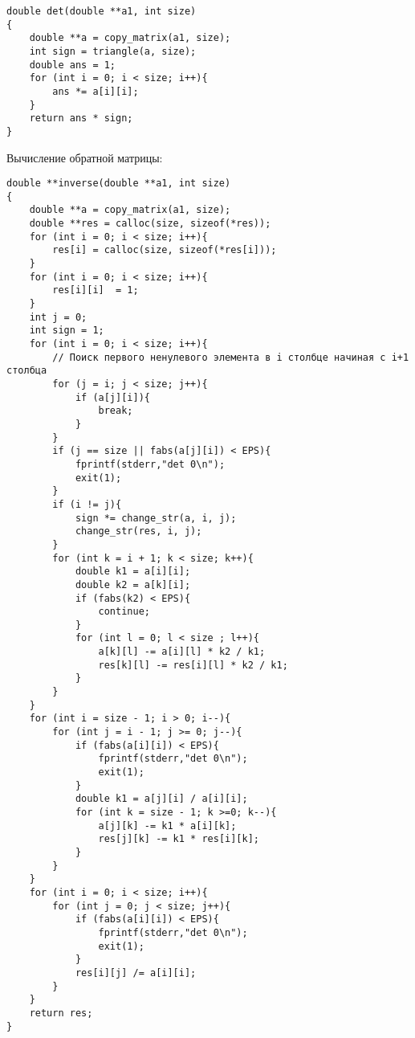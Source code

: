 \documentclass[a4paper,12pt,titlepage,finall]{article}
\begin{document}
\begin{itemize}
\begin{lstlisting}
double det(double **a1, int size)
{
    double **a = copy_matrix(a1, size);
    int sign = triangle(a, size);
    double ans = 1;
    for (int i = 0; i < size; i++){
        ans *= a[i][i];
    }
    return ans * sign;
}
\end{lstlisting}
\newpage
Вычисление обратной матрицы:
\begin{lstlisting}
double **inverse(double **a1, int size)
{
    double **a = copy_matrix(a1, size);
    double **res = calloc(size, sizeof(*res));
    for (int i = 0; i < size; i++){
        res[i] = calloc(size, sizeof(*res[i]));
    }
    for (int i = 0; i < size; i++){
        res[i][i]  = 1;
    }
    int j = 0;
    int sign = 1;
    for (int i = 0; i < size; i++){
        // Поиск первого ненулевого элемента в i столбце начиная с i+1 столбца
        for (j = i; j < size; j++){
            if (a[j][i]){
                break;
            }
        }
        if (j == size || fabs(a[j][i]) < EPS){
            fprintf(stderr,"det 0\n");
            exit(1);
        }
        if (i != j){
            sign *= change_str(a, i, j);
            change_str(res, i, j);
        }
        for (int k = i + 1; k < size; k++){
            double k1 = a[i][i];
            double k2 = a[k][i];
            if (fabs(k2) < EPS){
                continue;
            }
            for (int l = 0; l < size ; l++){
                a[k][l] -= a[i][l] * k2 / k1;
                res[k][l] -= res[i][l] * k2 / k1;
            }
        }
    }
    for (int i = size - 1; i > 0; i--){
        for (int j = i - 1; j >= 0; j--){
            if (fabs(a[i][i]) < EPS){
                fprintf(stderr,"det 0\n");
                exit(1);
            }
            double k1 = a[j][i] / a[i][i];
            for (int k = size - 1; k >=0; k--){
                a[j][k] -= k1 * a[i][k];
                res[j][k] -= k1 * res[i][k];
            }
        }
    }
    for (int i = 0; i < size; i++){
        for (int j = 0; j < size; j++){
            if (fabs(a[i][i]) < EPS){
                fprintf(stderr,"det 0\n");
                exit(1);
            }
            res[i][j] /= a[i][i];
        }
    }
    return res;
}

\end{lstlisting}

\newpage


\end{itemize}
\end{document}

